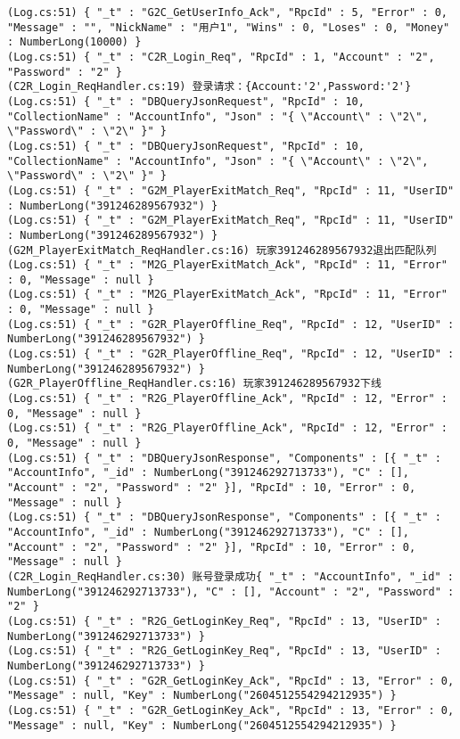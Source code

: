 \documentclass[9pt, b5paper]{article}
\begin{document}
\begin{itemize}
\begin{verbatim}
(Log.cs:51) { "_t" : "G2C_GetUserInfo_Ack", "RpcId" : 5, "Error" : 0, "Message" : "", "NickName" : "用户1", "Wins" : 0, "Loses" : 0, "Money" : NumberLong(10000) }
(Log.cs:51) { "_t" : "C2R_Login_Req", "RpcId" : 1, "Account" : "2", "Password" : "2" }
(C2R_Login_ReqHandler.cs:19) 登录请求：{Account:'2',Password:'2'}
(Log.cs:51) { "_t" : "DBQueryJsonRequest", "RpcId" : 10, "CollectionName" : "AccountInfo", "Json" : "{ \"Account\" : \"2\", \"Password\" : \"2\" }" }
(Log.cs:51) { "_t" : "DBQueryJsonRequest", "RpcId" : 10, "CollectionName" : "AccountInfo", "Json" : "{ \"Account\" : \"2\", \"Password\" : \"2\" }" }
(Log.cs:51) { "_t" : "G2M_PlayerExitMatch_Req", "RpcId" : 11, "UserID" : NumberLong("391246289567932") }
(Log.cs:51) { "_t" : "G2M_PlayerExitMatch_Req", "RpcId" : 11, "UserID" : NumberLong("391246289567932") }
(G2M_PlayerExitMatch_ReqHandler.cs:16) 玩家391246289567932退出匹配队列
(Log.cs:51) { "_t" : "M2G_PlayerExitMatch_Ack", "RpcId" : 11, "Error" : 0, "Message" : null }
(Log.cs:51) { "_t" : "M2G_PlayerExitMatch_Ack", "RpcId" : 11, "Error" : 0, "Message" : null }
(Log.cs:51) { "_t" : "G2R_PlayerOffline_Req", "RpcId" : 12, "UserID" : NumberLong("391246289567932") }
(Log.cs:51) { "_t" : "G2R_PlayerOffline_Req", "RpcId" : 12, "UserID" : NumberLong("391246289567932") }
(G2R_PlayerOffline_ReqHandler.cs:16) 玩家391246289567932下线
(Log.cs:51) { "_t" : "R2G_PlayerOffline_Ack", "RpcId" : 12, "Error" : 0, "Message" : null }
(Log.cs:51) { "_t" : "R2G_PlayerOffline_Ack", "RpcId" : 12, "Error" : 0, "Message" : null }
(Log.cs:51) { "_t" : "DBQueryJsonResponse", "Components" : [{ "_t" : "AccountInfo", "_id" : NumberLong("391246292713733"), "C" : [], "Account" : "2", "Password" : "2" }], "RpcId" : 10, "Error" : 0, "Message" : null }
(Log.cs:51) { "_t" : "DBQueryJsonResponse", "Components" : [{ "_t" : "AccountInfo", "_id" : NumberLong("391246292713733"), "C" : [], "Account" : "2", "Password" : "2" }], "RpcId" : 10, "Error" : 0, "Message" : null }
(C2R_Login_ReqHandler.cs:30) 账号登录成功{ "_t" : "AccountInfo", "_id" : NumberLong("391246292713733"), "C" : [], "Account" : "2", "Password" : "2" }
(Log.cs:51) { "_t" : "R2G_GetLoginKey_Req", "RpcId" : 13, "UserID" : NumberLong("391246292713733") }
(Log.cs:51) { "_t" : "R2G_GetLoginKey_Req", "RpcId" : 13, "UserID" : NumberLong("391246292713733") }
(Log.cs:51) { "_t" : "G2R_GetLoginKey_Ack", "RpcId" : 13, "Error" : 0, "Message" : null, "Key" : NumberLong("2604512554294212935") }
(Log.cs:51) { "_t" : "G2R_GetLoginKey_Ack", "RpcId" : 13, "Error" : 0, "Message" : null, "Key" : NumberLong("2604512554294212935") }
\end{verbatim}
\end{itemize}
\end{document}
